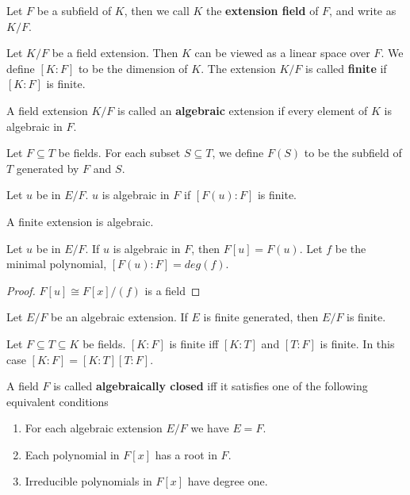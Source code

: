\documentclass[12pt]{book}
\begin{document}
\begin{definition}
	Let $F$ be a subfield of $K$, then we call $K$ the {\bf extension field} of $F$, and write as $K/F$.
\end{definition}

\begin{definition}
	Let $K/F$ be a field extension. Then $K$ can be viewed as a linear space over $F$. We define $[K:F]$ to be the dimension of $K$. The extension $K/F$ is called {\bf finite} if $[K:F]$ is finite.
\end{definition}

\begin{definition}
	A field extension $K/F$ is called an {\bf algebraic} extension if every element of $K$ is algebraic in $F$.
\end{definition}

\begin{definition}
	Let $F\subseteq T$ be fields. For each subset $S\subseteq T$, we define $F(S)$ to be the subfield of $T$ generated by $F$ and $S$. 
\end{definition}
  
\begin{lemma}
	Let $u$ be in $E/F$. $u$ is algebraic in $F$ if $[F(u):F]$ is finite.
\end{lemma}

\begin{corollary}
	A finite extension is algebraic.
\end{corollary}
  
\begin{lemma}
	Let $u$ be in $E/F$. If $u$ is algebraic in $F$, then $F[u]=F(u)$. Let $f$ be the minimal polynomial, $[F(u):F]=deg(f)$. 
\end{lemma}
\begin{proof}
	$F[u]\cong F[x]/(f)$ is a field
\end{proof}

\begin{lemma}
	Let $E/F$ be an algebraic extension. If $E$ is finite generated, then $E/F$ is finite.
\end{lemma}

\begin{lemma}
	Let $F\subseteq T\subseteq K$ be fields. $[K:F]$ is finite iff $[K:T]$ and $[T:F]$ is finite. In this case $[K:F]=[K:T][T:F]$.
\end{lemma}

\begin{definition}
	A field $F$ is called {\bf algebraically closed} iff it satisfies one of the following equivalent conditions
	\begin{enumerate}
		\item For each algebraic extension $E/F$ we have $E=F$.
		\item Each polynomial in $F[x]$ has a root in $F$.
		\item Irreducible polynomials in $F[x]$ have degree one.
	\end{enumerate}
\end{definition}
\end{document}
